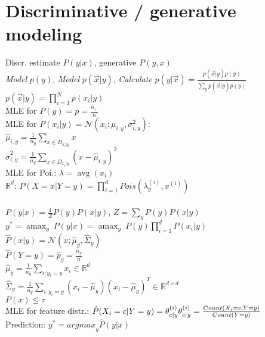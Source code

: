\section*{Discriminative / generative modeling}
Discr. estimate $P(y|x)$, generative $P(y,x)$ \\
\textit{Model} $p(y)$, \textit{Model} $p(\vec{x}|y)$, \textit{Calculate} $p(y|\vec{x}) = \frac{p(\vec{x}|y) p(y)}{\sum_y p(\vec{x}|y) p(y)}$\\
$p(\vec{x}|y) = \prod_{i=1}^N p(x_i|y)$\\
MLE for $P(y) = p = \frac{n_+}{n}$\\
MLE for $P(x_i|y) = \mathcal{N}(x_i;\mu_{i,y}, \sigma_{i,y}^2)$:\\
$\hat{\mu}_{i,y} = \frac{1}{n_y} \sum_{x\in D_{x_i|y}} x$\\
$\hat{\sigma}_{i,y}^2 = \frac{1}{n_y} \sum_{x\in D_{x_i|y}} (x-\hat{\mu}_{i,y})^2$\\
MLE for Poi.: $\lambda = \operatorname{avg}(x_i) $\\
$\mathbb{R}^d$: $P(X = x|Y = y) = \prod_{i=1}^dPois(\lambda_y^{(i)},x^{(i)})$\\
\\
$P(y|x) = \frac{1}{Z} P(y)P(x|y)$, $Z = \sum_y P(y) P(x|y)$\\
$y^* = {\operatorname{amax}_y} ~ P(y|x) = 
{\operatorname{amax}_y} ~ P(y) \prod_{i=1}^d P(x_i|y)$\\
$\hat{P}(x|y) = \mathcal{N}(x ; \hat{\mu}_y, \hat{\Sigma}_y)$\\
$\hat{P}(Y=y) = \hat{p}_y = \frac{n_y}{n}$\\
$\hat{\mu}_{y} = \frac{1}{n_y} \sum_{i:y_i=y} x_i \in \mathbb{R}^d$\\
$\hat{\Sigma}_{y} = \frac{1}{n_y} \sum_{i:y_i=y} (x_i - \hat{\mu}_{y})(x_i-\hat{\mu}_y)^T \in \mathbb{R}^{d \times d}$\\
$P(x) \leq \tau$\\
MLE for feature distr.:
$\hat{P}(X_i = c|Y = y) = \theta_{c|y}^{(i)}\\
\theta_{c|y}^{(i)} = \frac{Count(X_i = c, Y = y)}{Count(Y=y)}$\\
Prediction: $y^* = {argmax}_y\hat{P}(y|x)$\\
